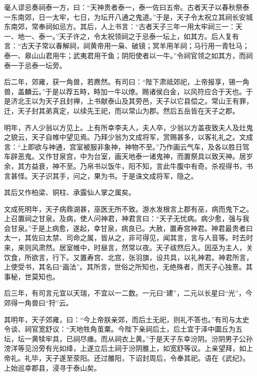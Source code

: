 \documentclass[12pt,UTF8]{ctexbook}
\begin{document}
毫人谬忌奏祠泰一方，曰：“天神贵者泰一，泰一佐曰五帝。古者天子以春秋祭泰一东南郊，日一太牢，七日，为坛开八通之鬼道。”于是，天子令太祝立其祠长安城东南郊，常奉祠如忌方。其后，人上书言：“古者天子三年一用太牢祠三一：天一、地一、泰一。”天子许之，令太祝领祠之于忌泰一坛上，如其方。后人复有言：“古天子常以春解祠，祠黄帝用一枭、破镜；冥羊用羊祠；马行用一青牡马；泰一、皋山山君用牛；武夷君用干鱼；阴阳使者以一牛。”令祠官领之如其方，而祠泰一于忌泰一坛旁。



后二年，郊雍，获一角兽，若麃然。有司曰：“陛下肃祗郊祀，上帝报享，锡一角兽，盖麟云。”于是以荐五畤，畤加一牛以燎。赐诸侯白金，以风符应合于天也。于是济北王以为天子且封禅，上书献泰山及其旁邑，天子以它县偿之。常山王有罪，迁，天子封其弟真定，以续先王祀，而以常山为郡。然后五岳皆在天子之郡。



明年，齐人少翁以方见上。上有所幸李夫人，夫人卒，少翁以方盖夜致夫人及灶鬼之貌云，天子自帷中望见焉。乃拜少翁为文成将军，赏赐甚多，以客礼礼之。文成言：“上即欲与神通，宫室被服非象神，神物不至。”乃作画云气车，及各以胜日驾车辟恶鬼。又作甘泉宫，中为台室，画天地泰一诸鬼神，而置祭具以致天神。居岁余，其方益衰，神不至。乃帛书以饭牛，阳不知，言此牛腹中有奇。杀视得书，书言甚怪。天子识其手，问之，果为书。于是诛文成将军，隐之。



其后又作柏梁、铜柱、承露仙人掌之属矣。



文成死明年，天子病鼎湖甚，巫医无所不致。游水发根言上郡有巫，病而鬼下之。上召置祠之甘泉。及病，使人问神君，神君言曰：“天子无忧病。病少愈，强与我会甘泉。”于是上病愈，遂起，幸甘泉，病良已。大赦，置寿宫神君。神君最贵者曰太一，其佐曰太禁、司命之属，皆从之，非可得见，闻其言，言与人音等。时去时来，来则风肃然。居室帷中，时昼言，然常以夜。天子祓然后入。因巫为主人，关饮食，所欲言，行下。又置寿宫、北宫，张羽旗，设共具，以礼神君。神君所言，上使受书，其名曰“画法”。其所言，世俗之所知也，无绝殊者，而天子心独憙。其事秘，世莫知也。



后三年，有司言元宜以天瑞，不宜以一二数。一元曰“建”，二元以长星曰“光”，今郊得一角兽曰“狩”云。



其明年，天子郊雍，曰：“今上帝朕亲郊，而后土无祀，则礼不答也。”有司与太史令谈、祠官宽舒议：“天地牲角茧粟。今陛下亲祠后土，后土宜于泽中圜丘为五坛，坛一黄犊牢具，已祠尽瘗。而从祠衣上黄。”于是天子东幸汾阴。汾阴男子公孙滂洋等见汾旁有光如绛，上遂立后土祠于汾阴脽上，如宽舒等议。上亲望拜，如上帝礼。礼毕，天子遂至荥阳。还过雒阳，下诏封周后，令奉其祀。语在《武纪》。上始巡幸郡县，浸寻于泰山矣。
\end{document}
